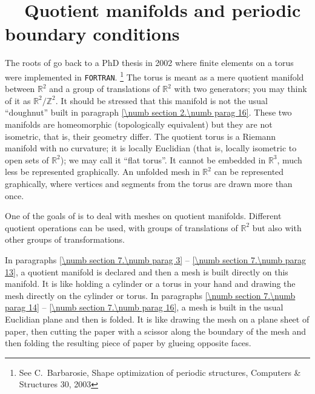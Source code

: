 
\chapter{~~Quotient manifolds and periodic boundary conditions}
\label{\numb section 7}


The roots of {\maniFEM} go back to a PhD thesis in 2002
where finite elements on a torus were implemented in {\small\tt FORTRAN}.%
\footnote{See %
C.~Barbarosie, Shape optimization of periodic structures,
Computers \& Structures 30, 2003}
The torus is meant as a mere quotient manifold between $ \mathbb{R}^2 $ and a group of
translations of $ \mathbb{R}^2 $ with two generators;
you may think of it as $ {\mathbb R}^2/{\mathbb Z}^2 $.
It should be stressed that this manifold is not the usual ``doughnut'' built in paragraph
\ref{\numb section 2.\numb parag 16}.
These two manifolds are homeomorphic (topologically equivalent) but they are not isometric,
that is, their geometry differ.
The quotient torus is a Riemann manifold with no curvature; it is locally Euclidian
(that is, locally isometric to open sets of $ \mathbb{R}^2 $); we may call it ``flat torus''.
It cannot be embedded in $ \mathbb{R}^3 $, much less be represented graphically.
An unfolded mesh in $ \mathbb{R}^2 $ can be represented graphically, where vertices and segments
from the torus are drawn more than once.

One of the goals of {\maniFEM} is to deal with meshes on quotient manifolds.
Different quotient operations can be used, with groups of translations of $ \mathbb{R}^2 $ but also
with other groups of transformations.

In paragraphs \ref{\numb section 7.\numb parag 3} -- \ref{\numb section 7.\numb parag 13},
a quotient manifold is declared and then a mesh is built directly on this manifold.
It is like holding a cylinder or a torus in your hand and drawing the mesh directly
on the cylinder or torus.
In paragraphs \ref{\numb section 7.\numb parag 14} -- \ref{\numb section 7.\numb parag 16},
a mesh is built in the usual Euclidian plane and then is folded.
It is like drawing the mesh on a plane sheet of paper, then cutting the paper with a scissor
along the boundary of the mesh and then folding the resulting piece of paper
by glueing opposite faces.


